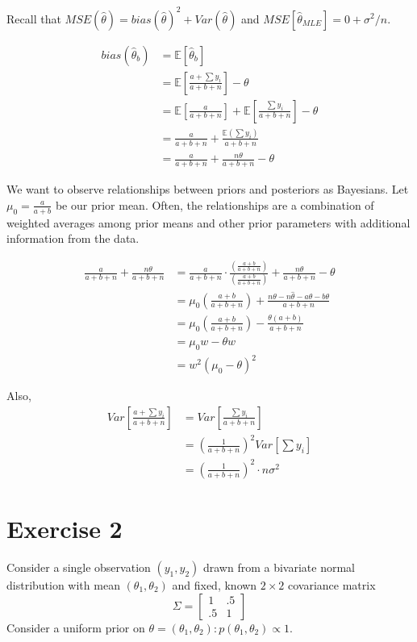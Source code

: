 \documentclass[titlepage, 12pt, leqno]{article}
\begin{document}
Recall that $MSE(\hat \theta) = bias(\hat \theta)^{2} + Var(\hat \theta)$ and
$MSE[\hat \theta_{MLE}] = 0 + \sigma^{2}/n.$

\begin{align*}
    bias(\hat \theta_{b}) &= \mathbb{E}[\hat \theta_{b}] \\
          &= \mathbb{E}\left[\frac{a + \sum y_{i}}{a+b+n}\right] - \theta\\
          &= \mathbb{E}\left[\frac{a}{a+b+n}\right] + \mathbb{E}\left[
          \frac{\sum y_{i}}{a+b+n}\right] - \theta \\
          &= \frac{a}{a+b+n} + \frac{\mathbb{E}(\sum y_{i})}{a+b+n} \\
          &= \frac{a}{a+b+n}+ \frac{n\theta}{a+b+n} - \theta
\end{align*}

We want to observe relationships between priors and posteriors as Bayesians.
Let $\mu_{0} = \frac{a}{a+b}$ be our prior mean. Often, the relationships are
a combination of weighted averages among prior means and other prior 
parameters with additional information from the data.

\begin{align*}
    \frac{a}{a+b+n} + \frac{n\theta}{a+b+n} &= \frac{a}{a+b+n}\cdot 
    \frac{\left(\frac{a+b}{a+b+n}\right)}{\left(\frac{a+b}{a+b+n}\right)} +
    \frac{n\theta}{a+b+n}-\theta \\
            &= \mu_{0}\left(\frac{a+b}{a+b+n}\right) + \frac{n\theta - 
            n\hat \theta - a\theta - b\theta}{a+b+n} \\
            &= \mu_{0}\left(\frac{a+b}{a+b+n}\right) - \frac{\theta(a+b)}{a+b+n}\\
            &= \mu_{0}w - \theta w \\
            &= w^{2}(\mu_{0}-\theta)^{2}
\end{align*}

Also,
\begin{align*}
    Var\left[\frac{a+\sum y_{i}}{a+b+n}\right] &= Var\left[\frac{\sum 
    y_{i}}{a+b+n}\right]\\
           &= \left(\frac{1}{a+b+n}\right)^{2}Var[\sum y_{i}] \\
           &= \left(\frac{1}{a+b+n}\right)^{2}\cdot n\sigma^{2}
\end{align*}


\section{Exercise 2}
Consider a single observation $(y_{1}, y_{2})$ drawn from a bivariate normal
distribution with mean $(\theta_{1}, \theta_{2})$ and fixed, known $2\times 2$
covariance matrix 
\[
\Sigma = 
\begin{bmatrix}
1 & .5\\ 
.5 & 1
\end{bmatrix}
\]
Consider a uniform prior on $\theta = (\theta_{1}, \theta_{2}):p(\theta_{1},
\theta_{2}) \propto 1$.
\end{document}
